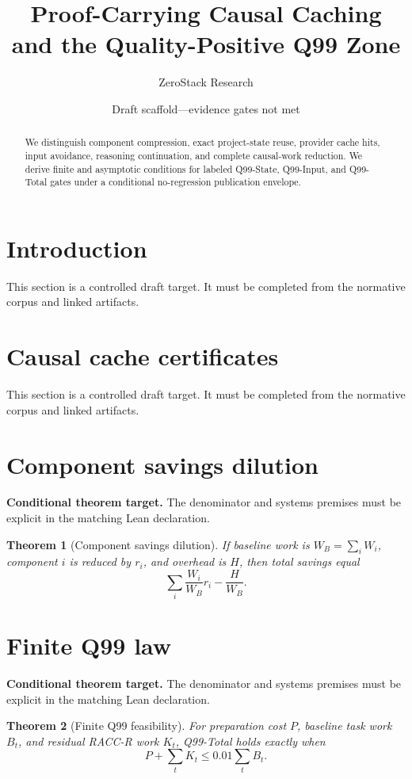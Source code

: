 \documentclass[11pt]{article}
\title{Proof-Carrying Causal Caching and the Quality-Positive Q99 Zone}
\author{ZeroStack Research}
\date{Draft scaffold---evidence gates not met}
\newtheorem{theorem}{Theorem}
\begin{document}
\maketitle
\begin{abstract}
We distinguish component compression, exact project-state reuse, provider cache hits, input avoidance, reasoning continuation, and complete causal-work reduction. We derive finite and asymptotic conditions for labeled Q99-State, Q99-Input, and Q99-Total gates under a conditional no-regression publication envelope.
\end{abstract}
\tableofcontents
\section{Introduction}
This section is a controlled draft target. It must be completed from the normative corpus and linked artifacts.

\section{Causal cache certificates}
This section is a controlled draft target. It must be completed from the normative corpus and linked artifacts.

\section{Component savings dilution}
\textbf{Conditional theorem target.} The denominator and systems premises must be explicit in the matching Lean declaration.
\begin{theorem}[Component savings dilution]
If baseline work is $W_B=\sum_i W_i$, component $i$ is reduced by $r_i$, and overhead is $H$, then total savings equal
\[
\sum_i \frac{W_i}{W_B}r_i-\frac{H}{W_B}.
\]
\end{theorem}

\section{Finite Q99 law}
\textbf{Conditional theorem target.} The denominator and systems premises must be explicit in the matching Lean declaration.
\begin{theorem}[Finite Q99 feasibility]
For preparation cost $P$, baseline task work $B_t$, and residual RACC-R work $K_t$, Q99-Total holds exactly when
\[
P+\sum_t K_t\le 0.01\sum_t B_t.
\]
\end{theorem}
\end{document}
